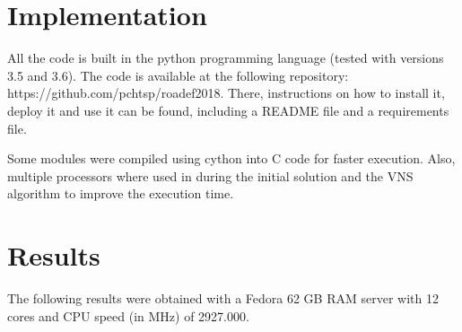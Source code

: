\documentclass{roadef}
\begin{document}
\section{Implementation}

    All the code is built in the python programming language (tested with versions 3.5 and 3.6). The code is available at the following repository: https://github.com/pchtsp/roadef2018. There, instructions on how to install it, deploy it and use it can be found, including a README file and a requirements file.

    Some modules were compiled using cython into C code for faster execution. Also, multiple processors where used in during the initial solution and the VNS algorithm to improve the execution time.

\section{Results}

The following results were obtained with a Fedora 62 GB RAM server with 12 cores and CPU speed (in MHz) of 2927.000.




\end{document}
